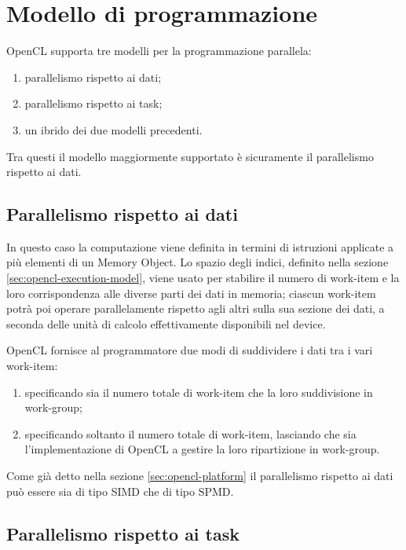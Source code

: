 \documentclass[12pt,a4paper,oneside]{book}
\begin{document}
\section{Modello di programmazione}

\ac{OpenCL} supporta tre modelli per la programmazione parallela:
\begin{enumerate}
\item parallelismo rispetto ai dati;
\item parallelismo rispetto ai task;
\item un ibrido dei due modelli precedenti.
\end{enumerate}

Tra questi il modello maggiormente supportato è sicuramente il parallelismo rispetto ai dati.

\subsection{Parallelismo rispetto ai dati}
\label{sec:opencl-data-parallel}

In questo caso la computazione viene definita in termini di istruzioni applicate a più elementi di un Memory Object. Lo spazio degli indici, definito nella sezione \ref{sec:opencl-execution-model}, viene usato per stabilire il numero di work-item e la loro corrispondenza alle diverse parti dei dati in memoria; ciascun work-item potrà poi operare parallelamente rispetto agli altri sulla sua sezione dei dati, a seconda delle unità di calcolo effettivamente disponibili nel device.

\ac{OpenCL} fornisce al programmatore due modi di suddividere i dati tra i vari work-item:
\begin{enumerate}
\item specificando sia il numero totale di work-item che la loro suddivisione in work-group;
\item specificando soltanto il numero totale di work-item, lasciando che sia l'implementazione di \ac{OpenCL} a gestire la loro ripartizione in work-group.
\end{enumerate}

Come già detto nella sezione \ref{sec:opencl-platform} il parallelismo rispetto ai dati può essere sia di tipo \ac{SIMD} che di tipo \ac{SPMD}.

\subsection{Parallelismo rispetto ai task}
\end{document}
